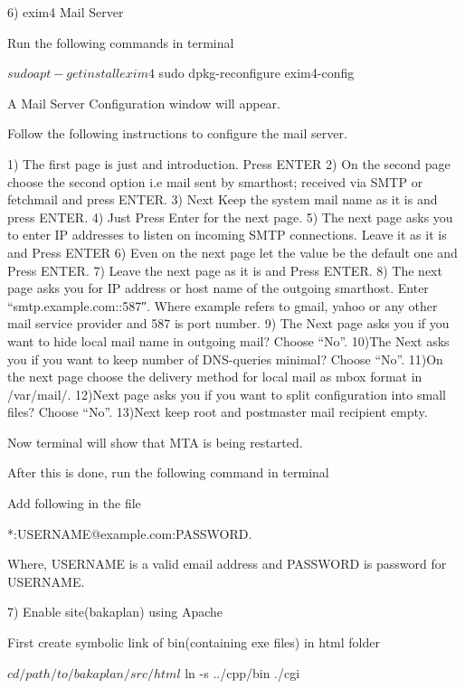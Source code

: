 6) exim4 Mail Server

Run the following commands in terminal \begin{DoxyVerb}$ sudo apt-get install exim4
$ sudo dpkg-reconfigure exim4-config
\end{DoxyVerb}


A Mail Server Configuration window will appear.\par
 Follow the following instructions to configure the mail server. \begin{DoxyVerb}1) The first page is just and introduction. Press ENTER
2) On the second page choose the second option i.e 
   mail sent by smarthost; received via SMTP or fetchmail and 
   press ENTER.
3) Next Keep the system mail name as it is and press ENTER.
4) Just Press Enter for the next page.
5) The next page asks you to enter IP addresses to listen on
   incoming SMTP connections. Leave it as it is and Press ENTER
6) Even on the next page let the value be the default one and 
   Press ENTER.
7) Leave the next page as it is and Press ENTER.
8) The next page asks you for IP address or host name of the outgoing
   smarthost. Enter “smtp.example.com::587″. Where example refers to
   gmail, yahoo or any other mail service provider and 587 is port number.
9) The Next page asks you if you want to hide local mail name in 
   outgoing mail? Choose “No”.
10)The Next asks you if you want to keep number of DNS-queries minimal?
   Choose “No”.
11)On the next page choose the  delivery method for local mail as
   mbox format in /var/mail/.
12)Next page asks you if you want to split configuration into small
   files? Choose “No”. 
13)Next keep root and postmaster mail recipient empty.
\end{DoxyVerb}


Now terminal will show that M\-T\-A is being restarted.\par
 After this is done, run the following command in terminal 


Add following in the file \begin{DoxyVerb}*:USERNAME@example.com:PASSWORD.

Where, USERNAME is  a valid email address and PASSWORD is  password for USERNAME.
\end{DoxyVerb}


7) Enable site(bakaplan) using Apache

First create symbolic link of bin(containing exe files) in html folder \begin{DoxyVerb}$ cd /path/to/bakaplan/src/html
$ ln -s ../cpp/bin ./cgi 
\end{DoxyVerb}


